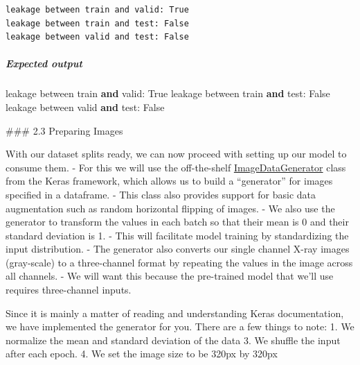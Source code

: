 \documentclass[11pt]{article}
\newenvironment{Shaded}{}{}
\newcommand{\KeywordTok}[1]{\textcolor[rgb]{0.00,0.44,0.13}{\textbf{{#1}}}}
\newcommand{\NormalTok}[1]{{#1}}
\newcommand{\VariableTok}[1]{\textcolor[rgb]{0.10,0.09,0.49}{{#1}}}
\begin{document}
    \begin{Verbatim}[commandchars=\\\{\}]
leakage between train and valid: True
leakage between train and test: False
leakage between valid and test: False

    \end{Verbatim}

    \hypertarget{expected-output}{%
\subparagraph{Expected output}\label{expected-output}}

\begin{Shaded}
\begin{Highlighting}[]
\NormalTok{leakage between train }\KeywordTok{and}\NormalTok{ valid: }\VariableTok{True}
\NormalTok{leakage between train }\KeywordTok{and}\NormalTok{ test: }\VariableTok{False}
\NormalTok{leakage between valid }\KeywordTok{and}\NormalTok{ test: }\VariableTok{False}
\end{Highlighting}
\end{Shaded}

     \#\#\# 2.3 Preparing Images

    With our dataset splits ready, we can now proceed with setting up our
model to consume them. - For this we will use the off-the-shelf
\href{https://keras.io/preprocessing/image/}{ImageDataGenerator} class
from the Keras framework, which allows us to build a ``generator'' for
images specified in a dataframe. - This class also provides support for
basic data augmentation such as random horizontal flipping of images. -
We also use the generator to transform the values in each batch so that
their mean is \(0\) and their standard deviation is 1. - This will
facilitate model training by standardizing the input distribution. - The
generator also converts our single channel X-ray images (gray-scale) to
a three-channel format by repeating the values in the image across all
channels. - We will want this because the pre-trained model that we'll
use requires three-channel inputs.

Since it is mainly a matter of reading and understanding Keras
documentation, we have implemented the generator for you. There are a
few things to note: 1. We normalize the mean and standard deviation of
the data 3. We shuffle the input after each epoch. 4. We set the image
size to be 320px by 320px
\end{document}
